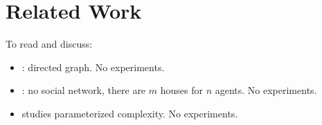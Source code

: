 \documentclass{article}
\begin{document}
\section{Related Work}
To read and discuss:
\begin{itemize}
	\item \cite{Bredereck0N18}: directed graph. No experiments.
	\item \cite{GanSV19}: no social network, there are $m$ houses for $n$ agents. No experiments.
	\item \cite{EibenGHO20} studies parameterized complexity. No experiments.
\end{itemize}

  
 
\end{document}

